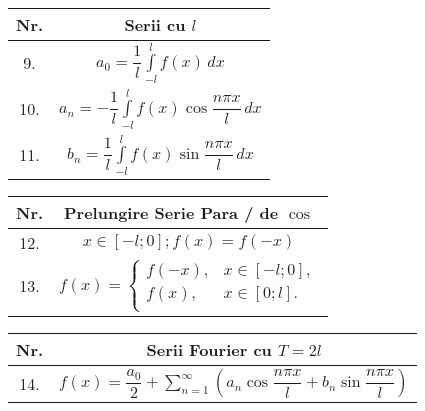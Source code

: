 \documentclass{article}
\begin{document}
\begin{minipage}{\dimexpr\textwidth+2cm}
  \vspace{1cm}

  \begin{tabular}{|c|c|}
    \hline
    \textbf{Nr.} & \textbf{Serii cu $l$}                                                                     \\
    \hline
    9.           & $ a_0 = \dfrac{1}{l} \displaystyle\int\limits_{-l}^{l} f(x) \,dx$                         \\
    \hline
    10.          & $ a_n = -\dfrac{1}{l} \displaystyle\int\limits_{-l}^{l} f(x) \cos \dfrac{n\pi x}{l} \,dx$ \\
    \hline
    11.          & $ b_n = \dfrac{1}{l} \displaystyle\int\limits_{-l}^{l} f(x) \sin \dfrac{n\pi x}{l} \,dx$  \\
    \hline
  \end{tabular}
  \hspace{1cm} %
  \begin{tabular}{|c|c|}
    \hline
    \textbf{Nr.} & \textbf{Prelungire Serie Para / de $\cos$} \\
    \hline
    12.          & $ x \in [-l; 0]; f(x) = f(-x) $            \\
    \hline
    13.          & $ f(x) = \begin{cases}
                                f(-x), & x \in [-l; 0], \\
                                f(x),  & x \in [0; l].  \\
                              \end{cases} $           \\
    \hline
  \end{tabular}

  \vspace{1cm}

  \begin{tabular}{|c|c|}
    \hline
    \textbf{Nr.} & \textbf{Serii Fourier cu $T = 2l$}                                                                                                         \\
    \hline
    14.          & $ f(x) = \dfrac{a_0}{2} + \displaystyle\sum\limits_{n = 1}^{\infty} \left(a_n \cos \dfrac{n\pi x}{l} + b_n \sin \dfrac{n\pi x}{l}\right) $ \\
    \hline
  \end{tabular}

\end{minipage}
\end{document}
